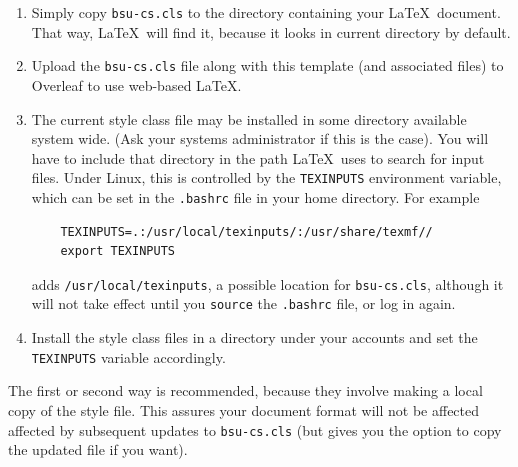 \documentclass[dissertation]{bsu-cs}  %
\begin{document}
\begin{enumerate}
\item Simply copy \texttt{bsu-cs.cls} to the directory containing your \LaTeX\ document.
That way, \LaTeX\ will find it, because it looks in current directory by default.

\item Upload the \texttt{bsu-cs.cls} file along with this template (and associated files)
to Overleaf to use web-based LaTeX.

\item The current style class file may be installed in some directory available system wide.  (Ask your
systems administrator if this is the case).  You will have to include that directory in the path
\LaTeX\ uses to search for input files.  Under Linux, this is controlled by the \texttt{TEXINPUTS}
environment variable, which can be set in the \texttt{.bashrc} file in your home directory.
For example
%

\begin{verbatim}
    TEXINPUTS=.:/usr/local/texinputs/:/usr/share/texmf//
    export TEXINPUTS
\end{verbatim}

adds \texttt{/usr/local/texinputs}, a possible location for \texttt{bsu-cs.cls}, although it
will not take effect until you \texttt{source} the \texttt{.bashrc} file, or log in again.

\item Install the style class files in a directory under your accounts and set the \texttt{TEXINPUTS}
variable accordingly.

\end{enumerate}

%

The first or second way is recommended, because they involve making a local copy of the style
file.  This assures your document format will not be affected affected by subsequent updates
to \texttt{bsu-cs.cls} (but gives you the option to copy the updated file if you want).
\end{document}
